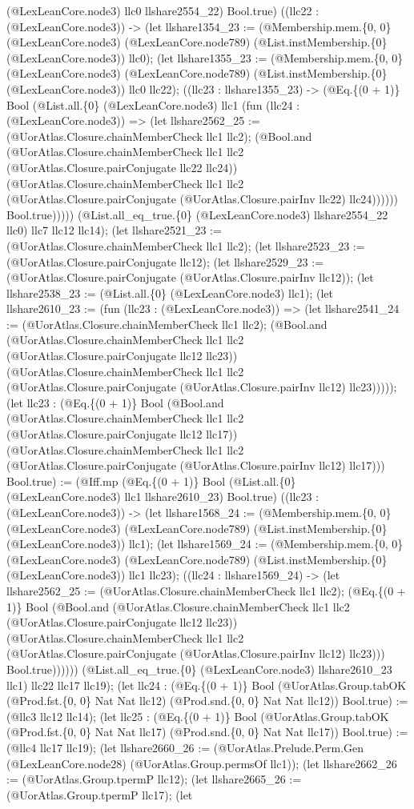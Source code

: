 \documentclass[11pt]{article}
\begin{document}
(@LexLeanCore.node3) llc0 llshare2554\_22) Bool.true) ((llc22 : (@LexLeanCore.node3)) -> (let llshare1354\_23 := (@Membership.mem.\{0, 0\} (@LexLeanCore.node3) (@LexLeanCore.node789) (@List.instMembership.\{0\} (@LexLeanCore.node3)) llc0); (let llshare1355\_23 := (@Membership.mem.\{0, 0\} (@LexLeanCore.node3) (@LexLeanCore.node789) (@List.instMembership.\{0\} (@LexLeanCore.node3)) llc0 llc22); ((llc23 : llshare1355\_23) -> (@Eq.\{(0 + 1)\} Bool (@List.all.\{0\} (@LexLeanCore.node3) llc1 (fun (llc24 : (@LexLeanCore.node3)) => (let llshare2562\_25 := (@UorAtlas.Closure.chainMemberCheck llc1 llc2); (@Bool.and (@UorAtlas.Closure.chainMemberCheck llc1 llc2 (@UorAtlas.Closure.pairConjugate llc22 llc24)) (@UorAtlas.Closure.chainMemberCheck llc1 llc2 (@UorAtlas.Closure.pairConjugate (@UorAtlas.Closure.pairInv llc22) llc24)))))) Bool.true))))) (@List.all\_eq\_true.\{0\} (@LexLeanCore.node3) llshare2554\_22 llc0) llc7 llc12 llc14); (let llshare2521\_23 := (@UorAtlas.Closure.chainMemberCheck llc1 llc2); (let llshare2523\_23 := (@UorAtlas.Closure.pairConjugate llc12); (let llshare2529\_23 := (@UorAtlas.Closure.pairConjugate (@UorAtlas.Closure.pairInv llc12)); (let llshare2538\_23 := (@List.all.\{0\} (@LexLeanCore.node3) llc1); (let llshare2610\_23 := (fun (llc23 : (@LexLeanCore.node3)) => (let llshare2541\_24 := (@UorAtlas.Closure.chainMemberCheck llc1 llc2); (@Bool.and (@UorAtlas.Closure.chainMemberCheck llc1 llc2 (@UorAtlas.Closure.pairConjugate llc12 llc23)) (@UorAtlas.Closure.chainMemberCheck llc1 llc2 (@UorAtlas.Closure.pairConjugate (@UorAtlas.Closure.pairInv llc12) llc23))))); (let llc23 : (@Eq.\{(0 + 1)\} Bool (@Bool.and (@UorAtlas.Closure.chainMemberCheck llc1 llc2 (@UorAtlas.Closure.pairConjugate llc12 llc17)) (@UorAtlas.Closure.chainMemberCheck llc1 llc2 (@UorAtlas.Closure.pairConjugate (@UorAtlas.Closure.pairInv llc12) llc17))) Bool.true) := (@Iff.mp (@Eq.\{(0 + 1)\} Bool (@List.all.\{0\} (@LexLeanCore.node3) llc1 llshare2610\_23) Bool.true) ((llc23 : (@LexLeanCore.node3)) -> (let llshare1568\_24 := (@Membership.mem.\{0, 0\} (@LexLeanCore.node3) (@LexLeanCore.node789) (@List.instMembership.\{0\} (@LexLeanCore.node3)) llc1); (let llshare1569\_24 := (@Membership.mem.\{0, 0\} (@LexLeanCore.node3) (@LexLeanCore.node789) (@List.instMembership.\{0\} (@LexLeanCore.node3)) llc1 llc23); ((llc24 : llshare1569\_24) -> (let llshare2562\_25 := (@UorAtlas.Closure.chainMemberCheck llc1 llc2); (@Eq.\{(0 + 1)\} Bool (@Bool.and (@UorAtlas.Closure.chainMemberCheck llc1 llc2 (@UorAtlas.Closure.pairConjugate llc12 llc23)) (@UorAtlas.Closure.chainMemberCheck llc1 llc2 (@UorAtlas.Closure.pairConjugate (@UorAtlas.Closure.pairInv llc12) llc23))) Bool.true)))))) (@List.all\_eq\_true.\{0\} (@LexLeanCore.node3) llshare2610\_23 llc1) llc22 llc17 llc19); (let llc24 : (@Eq.\{(0 + 1)\} Bool (@UorAtlas.Group.tabOK (@Prod.fst.\{0, 0\} Nat Nat llc12) (@Prod.snd.\{0, 0\} Nat Nat llc12)) Bool.true) := (@llc3 llc12 llc14); (let llc25 : (@Eq.\{(0 + 1)\} Bool (@UorAtlas.Group.tabOK (@Prod.fst.\{0, 0\} Nat Nat llc17) (@Prod.snd.\{0, 0\} Nat Nat llc17)) Bool.true) := (@llc4 llc17 llc19); (let llshare2660\_26 := (@UorAtlas.Prelude.Perm.Gen (@LexLeanCore.node28) (@UorAtlas.Group.permsOf llc1)); (let llshare2662\_26 := (@UorAtlas.Group.tpermP llc12); (let llshare2665\_26 := (@UorAtlas.Group.tpermP llc17); (let 
\end{document}
